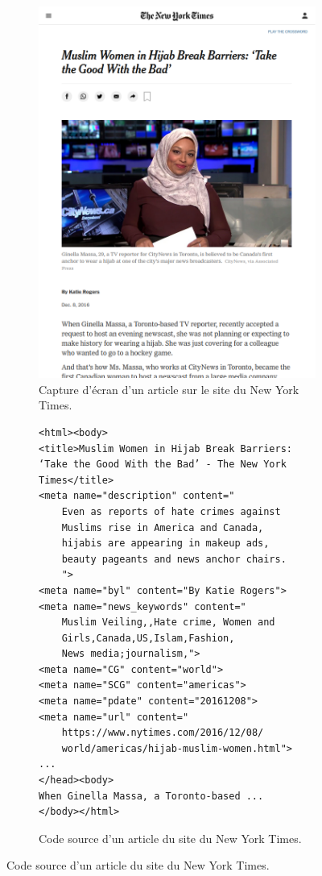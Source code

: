 \begin{figure}[!htbp]
    \begin{subfigure}{.48\textwidth}
        \centering
        \includegraphics[scale=0.28]{4_kptimes/figures/image_kptimes.png}
        \caption{Capture d'écran d'un article sur le site du New York Times.}
        \label{fig:img_kptimes}
    \end{subfigure}%
    \hfill
    \begin{subfigure}{.48\textwidth}
\begin{verbatim}
<html><body>
<title>Muslim Women in Hijab Break Barriers:
‘Take the Good With the Bad’ - The New York
Times</title>
<meta name="description" content="
    Even as reports of hate crimes against 
    Muslims rise in America and Canada, 
    hijabis are appearing in makeup ads, 
    beauty pageants and news anchor chairs.
    ">
<meta name="byl" content="By Katie Rogers">
<meta name="news_keywords" content="
    Muslim Veiling,,Hate crime, Women and 
    Girls,Canada,US,Islam,Fashion,
    News media;journalism,">
<meta name="CG" content="world">
<meta name="SCG" content="americas">
<meta name="pdate" content="20161208">
<meta name="url" content="
    https://www.nytimes.com/2016/12/08/
    world/americas/hijab-muslim-women.html">
...
</head><body>
When Ginella Massa, a Toronto-based ...
</body></html>
\end{verbatim}
    \caption{Code source d'un article du site du New York Times.}
    \label{fig:meta_kptimes}
\end{subfigure}%
    

\end{figure}
